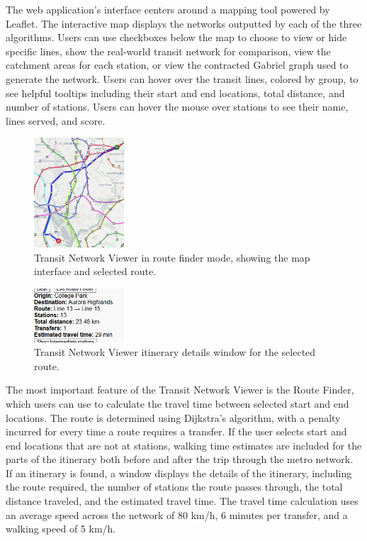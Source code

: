 \documentclass[sigconf,nonacm]{acmart}
\begin{document}
The web application's interface centers around a mapping tool powered by Leaflet. The interactive map displays the networks outputted by each of the three algorithms. Users can use checkboxes below the map to choose to view or hide specific lines, show the real-world transit network for comparison, view the catchment areas for each station, or view the contracted Gabriel graph used to generate the network. Users can hover over the transit lines, colored by group, to see helpful tooltips including their start and end locations, total distance, and number of stations. Users can hover the mouse over stations to see their name, lines served, and score. 

\begin{figure}[h]
    \centering
    \includegraphics[width=0.3\textwidth]{./img/itin_1_gen.png}
    \caption{Transit Network Viewer in route finder mode, showing the map interface and selected route.}
    \label{fig:viewer_map}
\end{figure}

\begin{figure}[h]
    \centering
    \includegraphics[width=0.3\textwidth]{./img/itin_1_gen_details.png}
    \caption{Transit Network Viewer itinerary details window for the selected route.}
    \label{fig:viewer_details}
\end{figure}

The most important feature of the Transit Network Viewer is the Route Finder, which users can use to calculate the travel time between selected start and end locations. The route is determined using Dijkstra's algorithm, with a penalty incurred for every time a route requires a transfer. If the user selects start and end locations that are not at stations, walking time estimates are included for the parts of the itinerary both before and after the trip through the metro network. If an itinerary is found, a window displays the details of the itinerary, including the route required, the number of stations the route passes through, the total distance traveled, and the estimated travel time. The travel time calculation uses an average speed across the network of 80 km/h, 6 minutes per transfer, and a walking speed of 5 km/h. 
\end{document}
